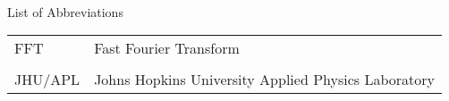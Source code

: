 

\renewcommand{\baselinestretch}{1}
\small\normalsize
\hbox{\ }

\vspace{-4em}

\begin{center}
\large{List of Abbreviations}
\end{center} 

\vspace{3pt}

\begin{supertabular}{ll}
FFT & Fast Fourier Transform \\
\\
JHU/APL & Johns Hopkins University Applied Physics Laboratory \\
\end{supertabular}
